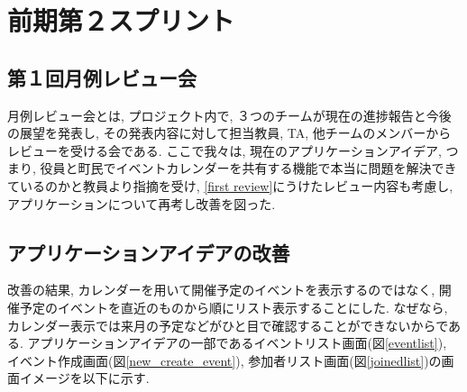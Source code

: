 \section{前期第２スプリント}

\subsection{第１回月例レビュー会}
月例レビュー会とは, プロジェクト内で, ３つのチームが現在の進捗報告と今後の展望を発表し, その発表内容に対して担当教員, TA, 他チームのメンバーからレビューを受ける会である.
ここで我々は, 現在のアプリケーションアイデア, つまり, 役員と町民でイベントカレンダーを共有する機能で本当に問題を解決できているのかと教員より指摘を受け,
\ref{first review}にうけたレビュー内容も考慮し, アプリケーションについて再考し改善を図った.


\subsection{アプリケーションアイデアの改善}
改善の結果, カレンダーを用いて開催予定のイベントを表示するのではなく,
開催予定のイベントを直近のものから順にリスト表示することにした.
なぜなら, カレンダー表示では来月の予定などがひと目で確認することができないからである.
アプリケーションアイデアの一部であるイベントリスト画面(図\ref{eventlist}),
イベント作成画面(図\ref{new_create_event}), 参加者リスト画面(図\ref{joinedlist})の画面イメージを以下に示す.

